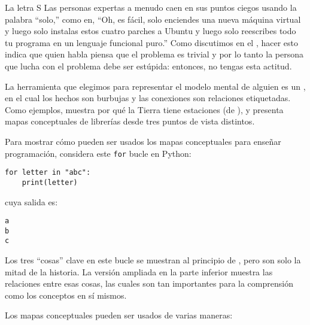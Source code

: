 \begin{aside}{La letra S}
 Las personas expertas a menudo caen en sus puntos ciegos usando la palabra ``solo,''
  como en,
  ``Oh, es fácil, solo enciendes una nueva máquina virtual
  y luego solo instalas estos cuatro parches a Ubuntu
  y luego solo reescribes todo tu programa en un lenguaje funcional puro.''
  Como discutimos en el ,
  hacer esto indica que quien habla piensa que el problema es trivial
  y por lo tanto la persona que lucha con el problema debe ser estúpida:
  entonces, no tengas esta actitud.


\end{aside}


La herramienta que elegimos para representar el modelo mental de alguien es un ,
en el cual los hechos son burbujas y las conexiones son relaciones etiquetadas.
Como ejemplos,
 muestra por qué la Tierra tiene estaciones (de ),
y  presenta mapas conceptuales de librerías desde tres puntos de vista distintos.


Para mostrar cómo pueden ser usados los mapas conceptuales para enseñar programación,
considera este \texttt{for} bucle en Python:

\begin{verbatim}
for letter in "abc":
    print(letter)
\end{verbatim}

\noindent
cuya salida es:

\begin{verbatim}
a
b
c
\end{verbatim}

Los tres ``cosas'' clave en este bucle se muestran al principio de ,
pero son solo la mitad de la historia.
La versión ampliada en la parte inferior muestra las relaciones entre esas cosas,
las cuales son tan importantes para la comprensión como los conceptos en sí mismos.


\newpage
Los mapas conceptuales pueden ser usados de varias maneras:

